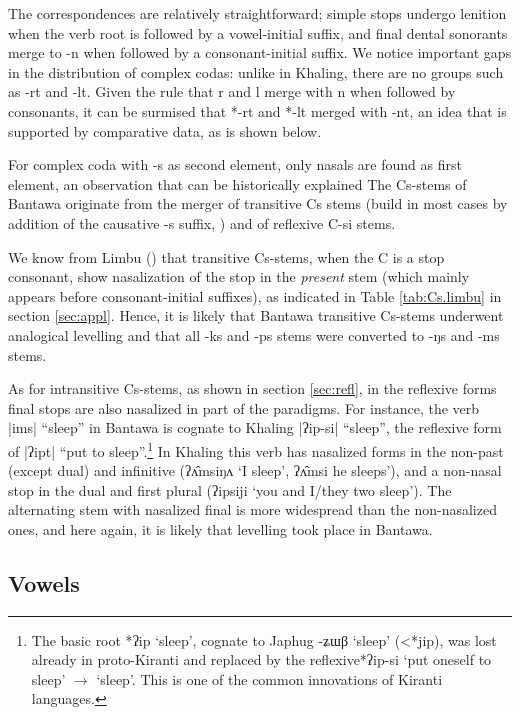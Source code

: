 \documentclass[oldfontcommands,oneside,a4paper,11pt]{article}
\newcommand{\ipa}[1]{{\phon\mbox{#1}}} %
\newcommand{\dhatu}[2]{|\ipa{#1}| ``#2''}
\begin{document}
The correspondences are relatively straightforward; simple stops undergo lenition when the verb root is followed by a vowel-initial suffix, and final dental sonorants merge to \ipa{-n} when followed by a consonant-initial suffix. We notice important gaps in the distribution of complex codas: unlike in Khaling, there are no groups such as \ipa{-rt} and \ipa{-lt}. Given the rule that \ipa{r} and \ipa{l} merge with \ipa{n} when followed by consonants, it can be surmised that *\ipa{-rt} and *\ipa{-lt} merged with \ipa{-nt}, an idea that is supported by comparative data, as is shown below.

For complex coda with \ipa{-s} as second element, only nasals are found as first element, an observation that can be historically explained The Cs-stems of Bantawa originate from the merger of transitive Cs stems (build in most cases by addition of the causative \ipa{-s} suffix, \citealt{michailovsky85dental}) and of reflexive C-si stems. 

We know from Limbu (\citealt[xiii]{michailovsky02dico}) that transitive Cs-stems, when the C is a stop consonant, show nasalization of the stop in the \textit{present} stem (which mainly appears before consonant-initial suffixes), as indicated in Table \ref{tab:Cs.limbu} in section \ref{sec:appl}. Hence, it is likely that Bantawa transitive Cs-stems underwent analogical levelling and that all \ipa{-ks} and \ipa{-ps} stems were converted to \ipa{-ŋs} and \ipa{-ms} stems.

As for intransitive Cs-stems, as shown in section \ref{sec:refl}, in the reflexive forms final stops are also nasalized in part of the paradigms. For instance, the verb \dhatu{ims}{sleep} in Bantawa is cognate to Khaling \dhatu{ʔip-si}{sleep}, the reflexive form of \dhatu{ʔipt}{put to sleep}.\footnote{The basic root *\ipa{ʔip} `sleep', cognate to Japhug \ipa{-ʑɯβ} `sleep' (<*\ipa{jip}), was lost already in proto-Kiranti and replaced by the reflexive*\ipa{ʔip-si} `put oneself to sleep' $\rightarrow$ `sleep'. This is one of the common innovations of Kiranti languages.} In Khaling this verb has nasalized forms in the non-past (except dual) and infinitive (\ipa{ʔʌ̂msiŋʌ} `I sleep', \ipa{ʔʌ̂msi} he sleeps'), and a non-nasal stop in the dual and first plural (\ipa{ʔipsiji} `you and I/they two sleep'). The alternating stem with nasalized final is more widespread than the non-nasalized ones, and here again, it is likely that levelling took place in Bantawa.

\subsection{Vowels} \label{sec:vowels}
\end{document}
